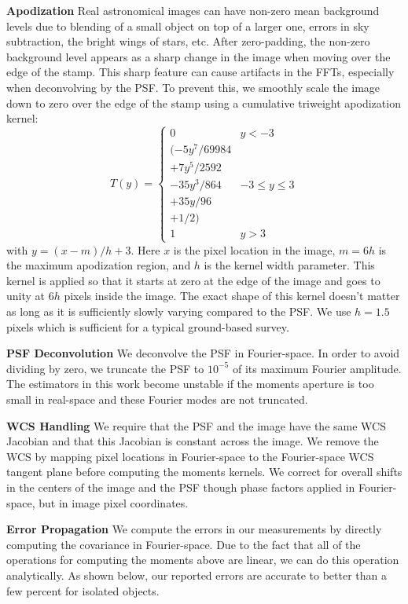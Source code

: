 \documentclass[twocolappendix, appendixfloats, numberedappendix, twocolumn, apj]{openjournal}
\begin{document}
\textbf{Apodization} Real astronomical images can have non-zero mean background levels
due to blending of a small object on top of a larger one, errors in sky subtraction,
the bright wings of stars, etc. After zero-padding, the non-zero background level appears
as a sharp change in the image when moving over the edge of the stamp. This sharp feature
can cause artifacts in the FFTs, especially when deconvolving by the PSF. To prevent this,
we smoothly scale the image down to zero over the edge of the stamp using a cumulative triweight
apodization kernel:
\begin{equation}
T(y) = \left\{
\begin{array}{cc}
0 & y < -3 \\
(-5y^7 / 69984 & \\
+ 7y^5 / 2592 & \\
- 35y^3 / 864 & -3 \le y \le 3 \\
+ 35y / 96 & \\
+ 1 / 2) &  \\
1 & y > 3
\end{array}
\right.
\end{equation}
with $y = (x-m)/h + 3$. Here $x$ is the pixel location in the image, $m=6h$ is the maximum
apodization region, and $h$ is the kernel width parameter. This kernel is applied so that it starts
at zero at the edge of the image and goes to unity at $6h$ pixels inside the image. The exact shape
of this kernel doesn't matter as long as it is sufficiently slowly varying compared to the PSF.
We use $h=1.5$ pixels which is sufficient for a typical ground-based survey.

\textbf{PSF Deconvolution} We deconvolve the PSF in Fourier-space. In order to avoid dividing by
zero, we truncate the PSF to $10^{-5}$ of its maximum Fourier amplitude. The estimators in this work
become unstable if the moments aperture is too small in real-space and these Fourier modes are not truncated.

\textbf{WCS Handling} We require that the PSF and the image have the same WCS Jacobian
and that this Jacobian is constant across the image. We remove the WCS by mapping pixel locations
in Fourier-space to the Fourier-space WCS tangent plane before computing the moments kernels.
We correct for overall shifts in the centers of the image and the PSF though phase factors applied
in Fourier-space, but in image pixel coordinates.

\textbf{Error Propagation} We compute the errors in our measurements by directly computing the
covariance in Fourier-space. Due to the fact that all of the operations for computing the moments
above are linear, we can do this operation analytically. As shown below, our reported errors are
accurate to better than a few percent for isolated objects.
\end{document}
